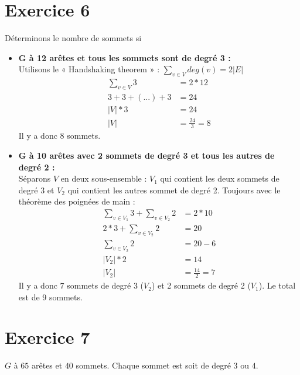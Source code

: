 \documentclass[fontsize=10pt]{article}
\begin{document}
\section*{Exercice 6}
Déterminons le nombre de sommets si
\begin{itemize}
    \item \textbf{G à 12 arêtes et tous les sommets sont de degré 3 :}\\
        Utilisons le « Handshaking theorem » : $ \displaystyle\sum_{v \in V} deg(v) = 2 |E|$\\
        \vspace{-.8em}
        \begin{align*}
            \displaystyle\sum_{v \in V} 3 &= 2 * 12\\
            3 + 3 + (...) + 3 &= 24\\
            |V| * 3 &= 24\\
            |V| &= \frac{24}{3} = 8
        \end{align*}
        Il y a donc $8$ sommets.

    \item \textbf{G à 10 arêtes avec 2 sommets de degré 3 et tous les autres de degré 2 :}\\
        Séparons $V$ en deux sous-ensemble : $V_{1}$ qui contient les deux
        sommets de degré 3 et $V_{2}$ qui contient les autres sommet de degré 2.
        Toujours avec le théorème des poignées de main :
        \vspace{-.8em}
        \begin{align*}
            \displaystyle\sum_{v \in V_{1}} 3 + \displaystyle\sum_{v \in V_{2}} 2 &= 2 * 10\\
            2 * 3 + \displaystyle\sum_{v \in V_{2}} 2 &= 20\\
            \displaystyle\sum_{v \in V_{2}} 2 &= 20 - 6\\
            |V_{2}| * 2 &= 14\\
            |V_{2}| &= \frac{14}{2} = 7
        \end{align*}
        Il y a donc $7$ sommets de degré 3 ($V_{2}$) et 2 sommets de degré
        2 ($V_{1}$). Le total est de 9 sommets.
\end{itemize}

\section*{Exercice 7}
$G$ à $65$ arêtes et $40$ sommets. Chaque sommet est soit de degré $3$ ou $4$.
\end{document}
